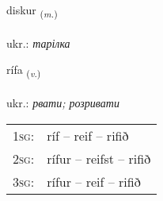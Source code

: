 \documentclass[frontgrid, backgrid]{flacards}\usepackage[]{graphicx}\usepackage[]{xcolor}
\begin{document}
\renewcommand{\blhead}{\vskip5pt {\small\bfseries\footnotesize Nafnorð | іменник }}
\renewcommand{\bcfoot}{\vskip5pt \hspace{2pt}{\small\bfseries\footnotesize 2K}}


{diskur \small{\textsubscript{(\textit{m.})}} \\[1ex] %
\textphonetic{[tɪskʏr]} \\
ukr.: \emph{тарілка} \\  [2ex]
\renewcommand*{\arraystretch}{0.8}
}

\renewcommand{\flhead}{\vskip5pt \fboxsep=0pt {\small\bfseries\footnotesize Sagnorð | дієслово}}
\renewcommand{\fcfoot}{\vskip5pt \fboxsep=0pt \hspace{2pt}{\small\bfseries\footnotesize 2K}}

\renewcommand{\blhead}{\vskip5pt {\small\bfseries\footnotesize Sagnorð | дієслово }}
\renewcommand{\bcfoot}{\vskip5pt \hspace{2pt}{\small\bfseries\footnotesize 2K}}


{rífa \small{\textsubscript{(\textit{v.})}} \\[1ex] %
\textphonetic{[riːva]} \\
ukr.: \emph{рвати; розривати} \\  [2ex]
\renewcommand*{\arraystretch}{0.8}
\begin{tabular}{p{1cm}l}
\textsc{1sg}: & ríf -- reif -- rifið \\ 
\textsc{2sg}: & rífur -- reifst -- rifið \\ 
\textsc{3sg}: & rífur -- reif -- rifið \\ 
\end{tabular}
}

\renewcommand{\flhead}{\vskip5pt \fboxsep=0pt {\small\bfseries\footnotesize Lýsingarorð | прикметник}}
\renewcommand{\fcfoot}{\vskip5pt \fboxsep=0pt \hspace{2pt}{\small\bfseries\footnotesize 2K}}
\end{document}
